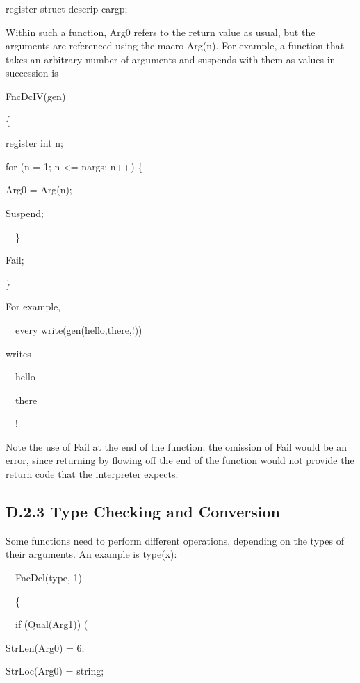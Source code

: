 {\ttfamily\mdseries
register struct descrip cargp;}


Within such a function, Arg0 refers to the return value as usual, but
the arguments are referenced using the macro Arg(n). For example, a
function that takes an arbitrary number of arguments and suspends with
them as values in succession is

{\ttfamily\mdseries
FncDcIV(gen)}

{\ttfamily\mdseries
\{}

{\ttfamily\mdseries
register int n;}

{\ttfamily\mdseries
for (n = 1; n {\textless}= nargs; n++) \{}

{\ttfamily\mdseries
Arg0 = Arg(n);}

{\ttfamily\mdseries
Suspend;}

{\ttfamily\mdseries
\ \ \}}

{\ttfamily\mdseries
Fail;}

{\ttfamily\mdseries
\}}


For example,

{\ttfamily\mdseries
\ \ every
write(gen({\textquotedbl}hello{\textquotedbl},{\textquotedbl}there{\textquotedbl},{\textquotedbl}!{\textquotedbl}))}


writes

{\ttfamily\mdseries
\ \ hello}

{\ttfamily\mdseries
\ \ there}

{\ttfamily\mdseries
\ \ !}


Note the use of Fail at the end of the function; the omission of Fail
would be an error, since returning by flowing off the end of the
function would not provide the return code that the interpreter
expects.

\subsection{D.2.3 Type Checking and Conversion}

Some functions need to perform different operations, depending on the
types of their arguments. An example is type(x):

{\ttfamily\mdseries
\ \ FncDcl(type, 1)}

{\ttfamily\mdseries
\ \ \{}

{\ttfamily\mdseries
\ \ if (Qual(Arg1)) (}

{\ttfamily\mdseries
StrLen(Arg0) = 6;}

{\ttfamily\mdseries
StrLoc(Arg0) = {\textquotedbl}string{\textquotedbl};}

